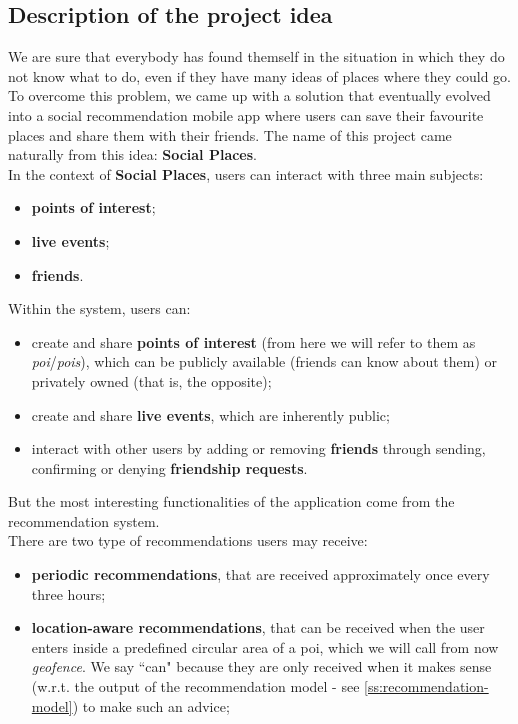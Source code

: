 \documentclass[../../main]{subfiles}
\begin{document}
\subsection{Description of the project idea}
\label{ss:description-project-idea}

We are sure that everybody has found themself in the situation in which they do not know what to do, even if they have many ideas of places where they could go.
To overcome this problem, we came up with a solution that eventually evolved into a social recommendation mobile app where users can save their favourite places and share them with their friends.
The name of this project came naturally from this idea: \textbf{Social Places}.\\
In the context of \textbf{Social Places}, users can interact with three main subjects:
\begin{itemize}
    \item \textbf{points of interest};
    \item \textbf{live events};
    \item \textbf{friends}.
\end{itemize}
Within the system, users can:
\begin{itemize}
    \item create and share \textbf{points of interest} (from here we will refer to them as \textit{poi}/\textit{pois}), which can be publicly available (friends can know about them) or privately owned (that is, the opposite);
    \item create and share \textbf{live events}, which are inherently public;
    \item interact with other users by adding or removing \textbf{friends} through sending, confirming or denying \textbf{friendship requests}.
\end{itemize}
But the most interesting functionalities of the application come from the recommendation system.\\
There are two type of recommendations users may receive:
\begin{itemize}
    \item \textbf{periodic recommendations}, that are received approximately once every three hours;
    \item \textbf{location-aware recommendations}, that can be received when the user enters inside a predefined circular area of a poi, which we will call from now \textit{geofence}.
    We say ``can" because they are only received when it makes sense (w.r.t. the output of the recommendation model - see \ref{ss:recommendation-model}) to make such an advice;
\end{itemize}
\end{document}
